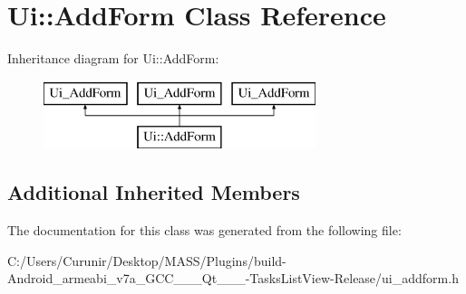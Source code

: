 \hypertarget{class_ui_1_1_add_form}{}\section{Ui\+:\+:Add\+Form Class Reference}
\label{class_ui_1_1_add_form}
Inheritance diagram for Ui\+:\+:Add\+Form\+:\begin{figure}[H]
\begin{center}
\leavevmode
\includegraphics[height=2.000000cm]{class_ui_1_1_add_form}
\end{center}
\end{figure}
\subsection*{Additional Inherited Members}


The documentation for this class was generated from the following file\+:\begin{DoxyCompactItemize}
\item 
C\+:/\+Users/\+Curunir/\+Desktop/\+M\+A\+S\+S/\+Plugins/build-\/\+Android\+\_\+armeabi\+\_\+v7a\+\_\+\+G\+C\+C\+\_\+\_\+\_\+\+Qt\+\_\+\_\+\_-\/\+Tasks\+List\+View-\/\+Release/ui\+\_\+addform.\+h\end{DoxyCompactItemize}
